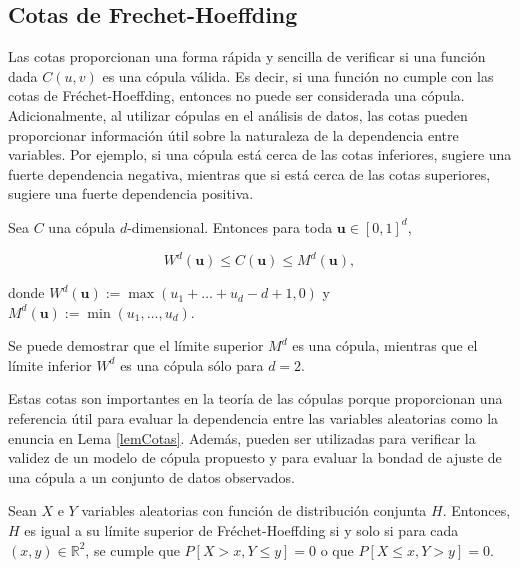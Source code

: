 
\subsection{Cotas de Frechet-Hoeffding}

Las cotas proporcionan una forma rápida y sencilla de verificar si una función dada $C(u, v)$  es una cópula válida. Es decir, si una función no cumple con las cotas de Fréchet-Hoeffding, entonces no puede ser considerada una cópula. Adicionalmente, al utilizar cópulas en el análisis de datos, las cotas pueden proporcionar información útil sobre la naturaleza de la dependencia entre variables. Por ejemplo, si una cópula está cerca de las cotas inferiores, sugiere una fuerte dependencia negativa, mientras que si está cerca de las cotas superiores, sugiere una fuerte dependencia positiva.

\begin{defn}
    Sea $C$ una cópula $d$-dimensional. Entonces para toda $\boldsymbol{u} \in[0,1]^d$,

    \begin{equation}
        W^d(\boldsymbol{u}) \leq C(\boldsymbol{u}) \leq M^d(\boldsymbol{u}),
    \end{equation}

donde $W^d(\boldsymbol{u}):= \max \left(u_1+\ldots+u_d-d+1,0\right)$ y $M^d(\boldsymbol{u}):=\min \left(u_1, \ldots, u_d\right)$.
\end{defn}

Se puede demostrar que el límite superior $M^d$ es una cópula, mientras que el límite inferior $W^d$ es una cópula sólo para $d = 2$.

Estas cotas son importantes en la teoría de las cópulas porque proporcionan una referencia útil para evaluar la dependencia entre las variables aleatorias como la enuncia en Lema \ref{lemCotas}. Además, pueden ser utilizadas para verificar la validez de un modelo de cópula propuesto y para evaluar la bondad de ajuste de una cópula a un conjunto de datos observados.

\begin{lema}\label{lemCotas}
    Sean $X$ e $Y$ variables aleatorias con función de distribución conjunta $H$. Entonces, $H$ es igual a su límite superior de Fréchet-Hoeffding si y solo si para cada $(x, y) \in \mathbb{R}^2$, se cumple que $P[X > x, Y \leq y] = 0$ o que $P[X \leq x, Y > y] = 0$.
\end{lema}

